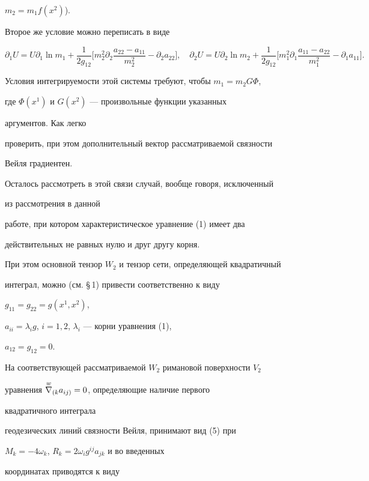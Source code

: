 $m_2=m_1f(x^2)$). 


Второе же условие можно переписать в виде 


$$ 


\partial_1U=U\partial_1\ln m_1+\frac{1}{2g_{12}}\bigg[ 


m^2_2\partial_2\frac{a_{22}-a_{11}}{m^2_2}-\partial_2a_{22}\bigg], 


\quad \partial_2U=U\partial_2\ln m_2+\frac{1}{2g_{12}}\bigg[ 


m^2_1\partial_1\frac{a_{11}-a_{22}}{m^2_1}- 


\partial_1a_{11}\bigg]. 


$$ 


Условия интегрируемости этой системы требуют, чтобы $m_1=m_2G\Phi$, 


где $\Phi(x^1)$ и $G(x^2)$ --- произвольные функции указанных 


аргументов. Как легко  


проверить, при этом дополнительный вектор рассматриваемой связности 


Вейля градиентен. 


 


Осталось рассмотреть в этой связи случай, вообще говоря, исключенный


из рассмотрения в данной


работе, при котором характеристическое уравнение (1) имеет два  


действительных не равных нулю и друг другу корня. 


При этом основной тензор $W_2$ и тензор сети, определяющей квадратичный 


интеграл, можно (см. \S\,1) привести соответственно к виду 


$g_{11}=g_{22}=g(x^1,x^2)$, 


$a_{ii}=\lambda_i g$, $i=1,2$, $\lambda_i$ --- корни уравнения (1), 


$a_{12}=g_{12}=0$. 


На соответствующей рассматриваемой $W_2$ римановой поверхности $V_2$ 


уравнения $\overset{w}{\nabla}{}_{(k}a_{ij)}=0$, определяющие наличие первого 


квадратичного интеграла 


геодезических линий связности Вейля, принимают вид (5) при 


$M_k=-4\omega_k$, $R_k=2\omega_i g^{ij}a_{jk}$ и во введенных 


координатах приводятся к виду 


